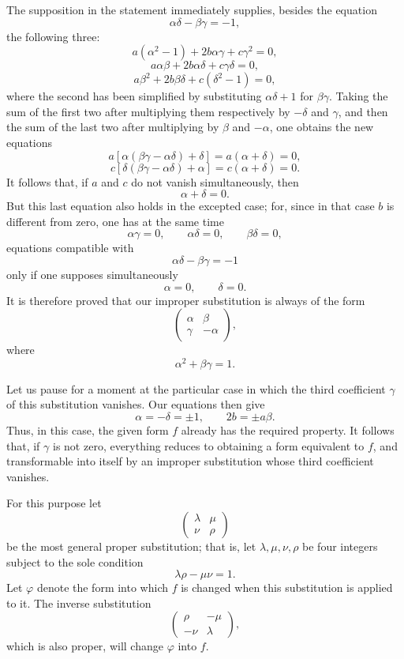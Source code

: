 \documentclass[11pt]{article}
\begin{document}
The supposition in the statement immediately supplies, besides the equation
\[
\alpha\delta-\beta\gamma=-1,
\]
the following three:
\[
a(\alpha^2-1)+2b\alpha\gamma+c\gamma^2=0,
\]
\[
a\alpha\beta+2b\alpha\delta+c\gamma\delta=0,
\]
\[
a\beta^2+2b\beta\delta+c(\delta^2-1)=0,
\]
where the second has been simplified by substituting \(\alpha\delta+1\) for \(\beta\gamma\). Taking the sum of the first two after multiplying them respectively by \(-\delta\) and \(\gamma\), and then the sum of the last two after multiplying by \(\beta\) and \(-\alpha\), one obtains the new equations
\[
a[\alpha(\beta\gamma-\alpha\delta)+\delta]=a(\alpha+\delta)=0,
\]
\[
c[\delta(\beta\gamma-\alpha\delta)+\alpha]=c(\alpha+\delta)=0.
\]
It follows that, if \(a\) and \(c\) do not vanish simultaneously, then
\[
\alpha+\delta=0.
\]
But this last equation also holds in the excepted case; for, since in that case \(b\) is different from zero, one has at the same time
\[
\alpha\gamma=0,\qquad \alpha\delta=0,\qquad \beta\delta=0,
\]
equations compatible with
\[
\alpha\delta-\beta\gamma=-1
\]
only if one supposes simultaneously
\[
\alpha=0,\qquad \delta=0.
\]
It is therefore proved that our improper substitution is always of the form
\[
\begin{pmatrix}\alpha&\beta\\ \gamma&-\alpha\end{pmatrix},
\]
where
\[
\alpha^2+\beta\gamma=1.
\]

Let us pause for a moment at the particular case in which the third coefficient \(\gamma\) of this substitution vanishes. Our equations then give
\[
\alpha=-\delta=\pm1,\qquad 2b=\pm a\beta.
\]
Thus, in this case, the given form \(f\) already has the required property. It follows that, if \(\gamma\) is not zero, everything reduces to obtaining a form equivalent to \(f\), and transformable into itself by an improper substitution whose third coefficient vanishes.

For this purpose let
\[
\begin{pmatrix}\lambda&\mu\\ \nu&\rho\end{pmatrix}
\]
be the most general proper substitution; that is, let \(\lambda,\mu,\nu,\rho\) be four integers subject to the sole condition
\[
\lambda\rho-\mu\nu=1.
\]
Let \(\varphi\) denote the form into which \(f\) is changed when this substitution is applied to it. The inverse substitution
\[
\begin{pmatrix}\rho&-\mu\\ -\nu&\lambda\end{pmatrix},
\]
which is also proper, will change \(\varphi\) into \(f\).
\end{document}
